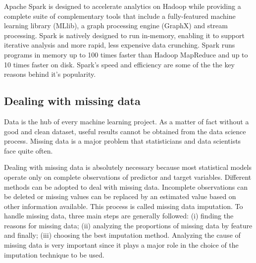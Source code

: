 \documentclass[LaM,binding=0.6cm, english]{sapthesis}
\begin{document}
\par Apache Spark is designed to accelerate analytics on Hadoop while providing a complete suite of complementary tools that include a fully-featured machine learning library (MLlib), a graph processing engine (GraphX) and stream processing. Spark is natively designed to run in-memory, enabling it to support iterative analysis and more rapid, less expensive data crunching. Spark runs programs in memory up to 100 times faster than Hadoop MapReduce and up to 10 times faster on disk. Spark's speed and efficiency are some of the the key reasons behind it's popularity. 

\subsection{Dealing with missing data}

Data is the hub of every machine learning project. As a matter of fact without a good and clean dataset, useful results cannot be obtained from the data science process. Missing data is a major problem that statisticians and data scientists face quite often.

\par Dealing with missing data is absolutely necessary because most statistical models operate only on complete observations of predictor and target variables. Different methods can be adopted to deal with missing data. Incomplete observations can be deleted or missing values can be replaced by an estimated value based on other information available. This process is called missing data imputation.\cite{Salgado2016} To handle missing data, three main steps are generally followed: (i) finding the reasons for missing data; (ii) analyzing the proportions of missing data by feature and finally; (iii) choosing the best imputation method. Analyzing the cause of missing data is very important since it plays a major role in the choice of the imputation technique to be used.

\end{document}
